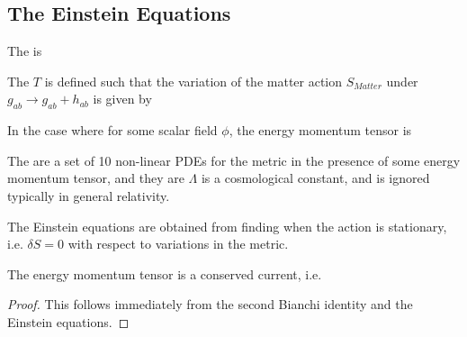 \documentclass{article}
\begin{document}
\subsection{The Einstein Equations}

\begin{definition}
The  is 
\end{definition}


\begin{definition}
The  $T$ is defined such that the variation of the matter action $S_{Matter}$ under $g_{ab} \to g_{ab} + h_{ab}$ is given by 
\end{definition}

\begin{example}
In the case where 
for some scalar field $\phi$, the energy momentum tensor is 
\end{example}

\begin{definition}
The  are a set of 10 non-linear PDEs for the metric in the presence of some energy momentum tensor, and they are 
$\Lambda$ is a cosmological constant, and is ignored typically in general relativity. 
\end{definition}

\begin{theorem}
The Einstein equations are obtained from finding when the action 
is stationary, i.e. $\delta S = 0$ with respect to variations in the metric. 
\end{theorem}

\begin{lemma}
The energy momentum tensor is a conserved current, i.e. 
\end{lemma}
\begin{proof}
This follows immediately from the second Bianchi identity and the Einstein equations. 
\end{proof}
\end{document}
